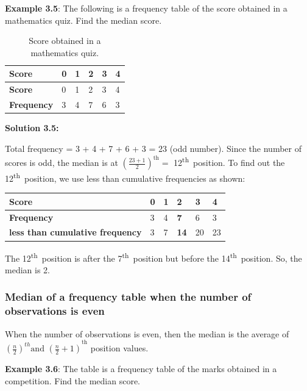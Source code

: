 \documentclass[
]{book}
\begin{document}
\textbf{Example 3.5}: The following is a frequency table of the score obtained in a mathematics quiz. Find the median score.

\begin{longtable}[]{@{}llllll@{}}
\caption{\label{tab:score} Score obtained in a mathematics quiz.}\tabularnewline
\toprule
\textbf{Score} & 0 & 1 & 2 & 3 & 4 \\
\midrule
\endfirsthead
\toprule
\textbf{Score} & 0 & 1 & 2 & 3 & 4 \\
\midrule
\endhead
\textbf{Frequency} & 3 & 4 & 7 & 6 & 3 \\
\bottomrule
\end{longtable}

\textbf{Solution 3.5:}

Total frequency = 3 + 4 + 7 + 6 + 3 = 23 (odd number). Since the number
of scores is odd, the median is at
\(\left( \frac{23 + 1}{2} \right)^{\text{th}} =\) 12\textsuperscript{th}~position. To find
out the 12\textsuperscript{th}~position, we use less than cumulative frequencies as
shown:

\begin{longtable}[]{@{}llllll@{}}
\toprule
\textbf{Score} & 0 & 1 & \textbf{2} & 3 & 4 \\
\midrule
\endhead
\textbf{Frequency} & 3 & 4 & \textbf{7} & 6 & 3 \\
\textbf{less than cumulative frequency} & 3 & 7 & \textbf{14} & 20 & 23 \\
\bottomrule
\end{longtable}

The 12\textsuperscript{th}~position is after the 7\textsuperscript{th}~position but before the
14\textsuperscript{th}~position. So, the median is 2.

\hypertarget{median-of-a-frequency-table-when-the-number-of-observations-is-even}{%
\subsubsection{Median of a frequency table when the number of observations is even}\label{median-of-a-frequency-table-when-the-number-of-observations-is-even}}

When the number of observations is even, then the median is the average
of
\({\left( \frac{n}{2} \right)^{th}\text{and\ }\left( \frac{n}{2} + 1 \right)}^{\text{th}}\)
position values.

\textbf{Example 3.6}: The table is a frequency table of the marks obtained in a competition. Find the median score.
\end{document}
